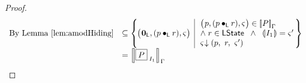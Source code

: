 \begin{lemma}
\begin{proof}
\[\begin{array}{r l}
	\text{By Lemma \ref{lem:amodHiding}} & 
	\subseteq \left\{
	\hspace*{-0.2cm}
	\begin{array}{l | l}
		\left(
		\hspace*{-0.15cm}
		\begin{array}{l}
		\unitL,
		(p \composeL r)
		, \amod{}
		\end{array}
		\hspace*{-0.15cm}
		\right)
		&
		\hspace*{-0.1cm}
		\begin{array}{l}
			\left(
			\hspace*{-0.15cm}
			\begin{array}{l}
			p, 
			(p \composeL r)
			, \amod{}
			\end{array}
			\hspace*{-0.15cm}
			\right) \in \sem[\lenv]{P}\\
			

			
			\land\; r \in \LState \;\;\land\;\; \intermediateSemI{I_1} = \amod{}'\\
			
			\extendsAM{\amod{}}{p}{\ r}{\ \amod{}'}
		\end{array}
		\hspace*{-0.1cm}
	\end{array}
	\hspace*{-0.2cm}
	\right\} \\
	
	
	
	
	
	
	
	
	& = \sem[\lenv]{\shared{P}{I_1}}
\end{array}
\]
%
\end{proof}
%
\end{lemma}
%
%
